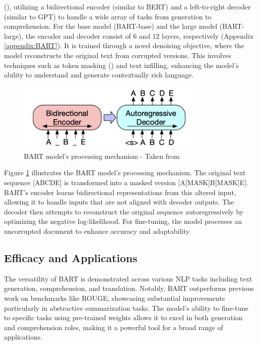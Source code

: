     (\cite{vaswani2023attention}), utilizing a bidirectional encoder (similar to BERT) and a left-to-right decoder (similar to GPT) to handle a wide array of tasks from generation to comprehension. For the base model (BART-base) and the large model (BART-large), the encoder and decoder consist of \(6\) and \(12\) layers, respectively (Appendix \ref{appendix:BART}).
    It is trained through a novel denoising objective, where the model reconstructs the original text from corrupted versions. This involves techniques such as token masking (\cite{devlin2019bert}) and text infilling, enhancing the model's ability to understand and generate contextually rich language.
    \begin{figure}[H]
        \centering
        \includegraphics[width=0.8\textwidth]{figs/BART_architecture.png}
        \caption{BART model's processing mechanism - Taken from \cite{lewis2019bart}}
        \label{fig:bart_process}
    \end{figure}
    Figure \ref{fig:bart_process} illustrates the BART model's processing mechanism. The original text sequence [ABCDE] is transformed into a masked version [A[MASK]B[MASK]E]. BART's encoder learns bidirectional representations from this altered input, allowing it to handle inputs that are not aligned with decoder outputs. The decoder then attempts to reconstruct the original sequence autoregressively by optimizing the negative log-likelihood. For fine-tuning, the model processes an uncorrupted document to enhance accuracy and adaptability.
    \subsection{Efficacy and Applications}
    The versatility of BART is demonstrated across various NLP tasks including text generation, comprehension, and translation. Notably, BART outperforms previous work on benchmarks like ROUGE, showcasing substantial improvements particularly in abstractive summarization tasks. The model's ability to fine-tune to specific tasks using pre-trained weights allows it to excel in both generation and comprehension roles, making it a powerful tool for a broad range of applications.

